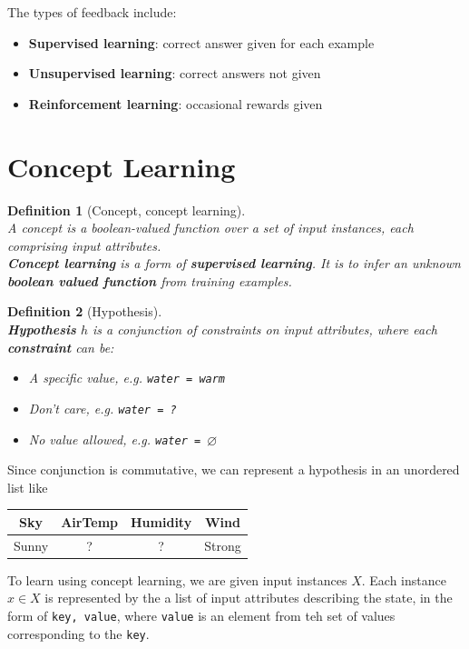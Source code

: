 \documentclass[12pt]{article}
\newtheorem{definition}{Definition}[section]
\theoremstyle{definition}
\begin{document}
The types of feedback include:
\begin{itemize}
	\item \textbf{Supervised learning}: correct answer given for each example
	\item \textbf{Unsupervised learning}: correct answers not given
	\item \textbf{Reinforcement learning}: occasional rewards given
\end{itemize}
\clearpage

\section{Concept Learning}
\begin{definition}[Concept, concept learning]
\hfill\\\normalfont A concept is a boolean-valued function over a set of input instances, each comprising input attributes.\\
\textbf{Concept learning} is a form of \textbf{supervised learning}. It is to infer an unknown \textbf{boolean valued function} from \textit{training examples}.
\end{definition}
\begin{definition}[Hypothesis]
\hfill\\\normalfont \textbf{Hypothesis} $h$ is a conjunction of constraints on input attributes, where each \textbf{constraint} can be:
\begin{itemize}
	\item A specific value, e.g. \texttt{water = warm}
	\item Don't care, e.g. \texttt{water = ?}
	\item No value allowed, e.g. \texttt{water = }$\varnothing$
\end{itemize}
\end{definition}
Since conjunction is commutative, we can represent a hypothesis in an unordered list like
\begin{table}[h]
\centering
\begin{tabular}{|c|c|c|c|}
\hline
Sky & AirTemp & Humidity & Wind\\\hline
Sunny & ? & ? & Strong \\\hline
\end{tabular}
\end{table}
To learn using concept learning, we are given input instances $X$. Each instance $x\in X$ is represented by the a list of input attributes describing the state, in the form of \texttt{key, value}, where \texttt{value} is an element from teh set of values corresponding to the \texttt{key}.\\
\end{document}
